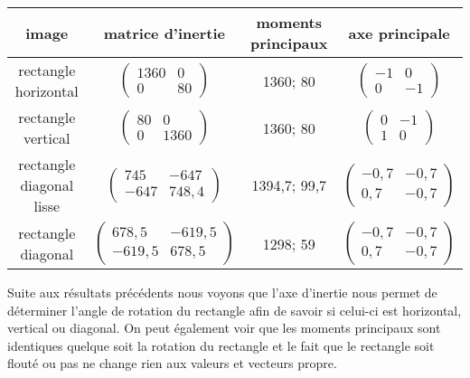 \documentclass{article}
\begin{document}
  \begin{center}
    \begin{tabular}{|c|c|c|c|}
      \hline
      \textbf{image} & \textbf{matrice d'inertie} & \textbf{moments principaux} & \textbf{axe principale} \\
      \hline
      rectangle horizontal & $\begin{pmatrix}
			      1360 & 0 \\
			      0 & 80 
			      \end{pmatrix}$ 
			  & 1360; 80
			  &  $\begin{pmatrix}
			      -1 & 0 \\
			      0 & -1 
			      \end{pmatrix}$\\
      \hline
      rectangle vertical & $\begin{pmatrix}
			      80 & 0 \\
			      0 & 1360 
			      \end{pmatrix}$
			  & 1360; 80
			  &  $\begin{pmatrix}
			      0 & -1 \\
			      1 & 0 
			      \end{pmatrix}$\\
      \hline
      rectangle diagonal lisse & $\begin{pmatrix}
			      745 & -647 \\
			      -647 & 748,4 
			      \end{pmatrix}$
			  & 1394,7; 99,7
			  &  $\begin{pmatrix}
			      -0,7 & -0,7 \\
			      0,7 & -0,7 
			      \end{pmatrix}$\\
      \hline
      rectangle diagonal & $\begin{pmatrix}
			      678,5 & -619,5 \\
			      -619,5 & 678,5 
			      \end{pmatrix}$
			  & 1298; 59
			  &  $\begin{pmatrix}
			      -0,7 & -0,7 \\
			      0,7 & -0,7 
			      \end{pmatrix}$\\
      \hline
    \end{tabular}
  \end{center}
  
  Suite aux résultats précédents nous voyons que l'axe d'inertie nous permet de déterminer 
  l'angle de rotation du rectangle afin de savoir si celui-ci est horizontal, vertical ou diagonal. 
  On peut également voir que les moments principaux sont identiques quelque soit la rotation du rectangle
  et le fait que le rectangle soit flouté ou pas ne change rien aux valeurs et vecteurs propre.\\
  
\end{document}
